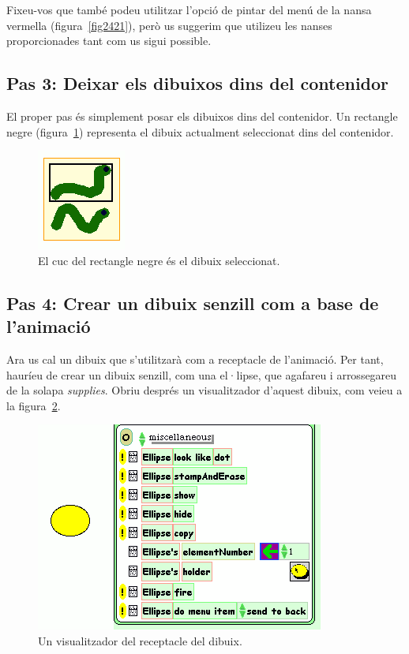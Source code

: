 Fixeu-vos que també podeu utilitzar l'opció de pintar del menú de la nansa vermella (figura~\ref{fig2421}), però us suggerim que utilizeu les nanses proporcionades tant com us sigui possible. 

\subsection{Pas 3: Deixar els dibuixos dins del contenidor}
El proper pas és simplement posar els dibuixos dins del contenidor. Un rectangle negre (figura~\ref{fig2422}) representa el dibuix actualment seleccionat dins del contenidor.
\begin{figure}[h!]
\begin{center}
\includegraphics[scale=0.75]{Imatges/figura24-22}
\end{center}
\caption{El cuc del rectangle negre és el dibuix seleccionat.}
\label{fig2422}
\end{figure}

\subsection{Pas 4: Crear un dibuix senzill com a base de l'animació}
Ara us cal un dibuix que s'utilitzarà com a receptacle de l'animació. Per tant, hauríeu de crear un dibuix senzill, com una el·lipse, que agafareu i arrossegareu de la solapa \emph{supplies}. Obriu després un visualitzador d'aquest dibuix, com veieu a la figura~\ref{fig2423}.
\begin{figure}[h!]
\begin{center}
\includegraphics[scale=0.5]{Imatges/figura24-23}
\end{center}
\caption{Un visualitzador del receptacle del dibuix.}
\label{fig2423}
\end{figure}

